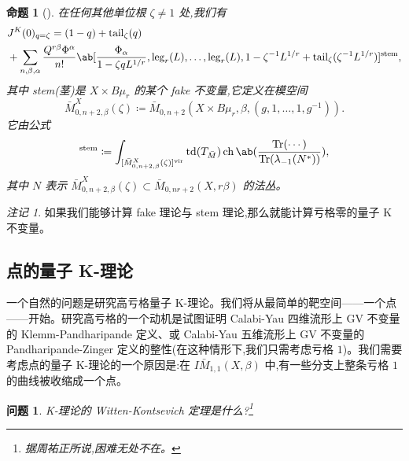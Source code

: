\documentclass{amsart}
\newtheorem{prop}[thm]{命题}
\newtheorem{quest}[thm]{问题}
\theoremstyle{definition}
\theoremstyle{remark}
\newtheorem{rmk}[thm]{注记}
\theoremstyle{plain}
\theoremstyle{definition}
\theoremstyle{remark}
\newcommand{\mr}[1]{\mathrm{#1}}
\newcommand{\on}[1]{\operatorname{#1}}
\newcommand{\1}{\mathbf{1}}
\newcommand{\2}{\mathbf{2}}
\newcommand{\3}{\mathbf{3}}
\newcommand{\vir}{\mr{vir}}
\begin{document}
\begin{prop}[{\cite{GiventalTonita2014}}]
    在任何其他单位根 \(\zeta \neq 1\) 处,我们有
    \begin{align*}
        &J^K(0)_{q = \zeta} = (1-q) + \mr{tail}_{\zeta}(q) \\
        &+ \sum_{n,\beta,\alpha} \frac{Q^{r\beta}\Phi^{\alpha}}{n!} \ab[\frac{\Phi_{\alpha}}{1-\zeta q L^{1/r}}, \mr{leg}_r(L), \ldots, \mr{leg}_r(L), 1 - \zeta^{-1}L^{1/r} + \mr{tail}_{\zeta}(\zeta^{-1} L^{1/r})]^{\mr{stem}},
    \end{align*}
    其中 stem(茎)是 \(X \times B\mu_r\) 的某个 fake 不变量,它定义在模空间
    \[ \bar{M}_{0,n+2,\beta}^X(\zeta) \coloneqq \bar{M}_{0,n+2}(X \times B\mu_r, \beta, (g, 1, \ldots, 1, g^{-1})). \]
    它由公式
    \begin{align*}
        [\cdots]^{\mr{stem}} \coloneqq \int_{[\bar{M}_{0,n+2,\beta}^X(\zeta)]^{\vir}} \on{td}(T_{\bar{M}}) \on{ch}\ab(\frac{\on{Tr}(\cdots)}{\on{Tr}(\lambda_{-1}(N^*))}), 
    \end{align*}
    其中 \(N\) 表示 \(\bar{M}_{0,n+2,\beta}^X(\zeta) \subset \bar{M}_{0,nr+2}(X, r\beta)\) 的法丛。
\end{prop}

\begin{rmk}
    如果我们能够计算 fake 理论与 stem 理论,那么就能计算亏格零的量子 K 不变量。
\end{rmk}

\subsection{点的量子 K-理论}%
\label{sub:Quantum K-theory of a point}

一个自然的问题是研究高亏格量子 K-理论。我们将从最简单的靶空间——一个点——开始。研究高亏格的一个动机是试图证明 Calabi-Yau 四维流形上 GV 不变量的 Klemm-Pandharipande 定义、或 Calabi-Yau 五维流形上 GV 不变量的 Pandharipande-Zinger 定义的整性(在这种情形下,我们只需考虑亏格 \(1\))。我们需要考虑点的量子 K-理论的一个原因是:在 \(I\bar{M}_{1,1}(X, \beta)\) 中,有一些分支上整条亏格 \(1\) 的曲线被收缩成一个点。

\begin{quest}
    K-理论的 Witten-Kontsevich 定理是什么?\footnote{据周祐正所说,困难无处不在。}
\end{quest}
\end{document}
